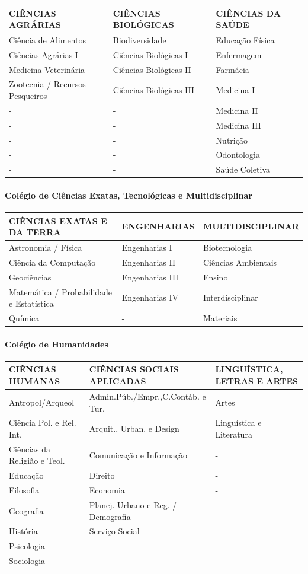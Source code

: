 \documentclass[]{article}
\let\oldparagraph\paragraph
\renewcommand{\paragraph}[1]{\oldparagraph{#1}\mbox{}}
\begin{document}
\begin{longtable}[]{@{}lll@{}}
\toprule
CIÊNCIAS AGRÁRIAS & CIÊNCIAS BIOLÓGICAS & CIÊNCIAS DA
SAÚDE\tabularnewline
\midrule
\endhead
Ciência de Alimentos & Biodiversidade & Educação Física\tabularnewline
Ciências Agrárias I & Ciências Biológicas I & Enfermagem\tabularnewline
Medicina Veterinária & Ciências Biológicas II & Farmácia\tabularnewline
Zootecnia / Recursos Pesqueiros & Ciências Biológicas III & Medicina
I\tabularnewline
- & - & Medicina II\tabularnewline
- & - & Medicina III\tabularnewline
- & - & Nutrição\tabularnewline
- & - & Odontologia\tabularnewline
- & - & Saúde Coletiva\tabularnewline
\bottomrule
\end{longtable}

\paragraph{Colégio de Ciências Exatas, Tecnológicas e
Multidisciplinar}\label{colegio-de-ciencias-exatas-tecnologicas-e-multidisciplinar}

\begin{longtable}[]{@{}lll@{}}
\toprule
CIÊNCIAS EXATAS E DA TERRA & ENGENHARIAS &
MULTIDISCIPLINAR\tabularnewline
\midrule
\endhead
Astronomia / Física & Engenharias I & Biotecnologia\tabularnewline
Ciência da Computação & Engenharias II & Ciências
Ambientais\tabularnewline
Geociências & Engenharias III & Ensino\tabularnewline
Matemática / Probabilidade e Estatística & Engenharias IV &
Interdisciplinar\tabularnewline
Química & - & Materiais\tabularnewline
\bottomrule
\end{longtable}

\paragraph{Colégio de Humanidades}\label{colegio-de-humanidades}

\begin{longtable}[]{@{}lll@{}}
\toprule
CIÊNCIAS HUMANAS & CIÊNCIAS SOCIAIS APLICADAS & LINGUÍSTICA, LETRAS E
ARTES\tabularnewline
\midrule
\endhead
Antropol/Arqueol & Admin.Púb./Empr.,C.Contáb. e Tur. &
Artes\tabularnewline
Ciência Pol. e Rel. Int. & Arquit., Urban. e Design & Linguística e
Literatura\tabularnewline
Ciências da Religião e Teol. & Comunicação e Informação &
-\tabularnewline
Educação & Direito & -\tabularnewline
Filosofia & Economia & -\tabularnewline
Geografia & Planej. Urbano e Reg. / Demografia & -\tabularnewline
História & Serviço Social & -\tabularnewline
Psicologia & - & -\tabularnewline
Sociologia & - & -\tabularnewline
\bottomrule
\end{longtable}
\end{document}
